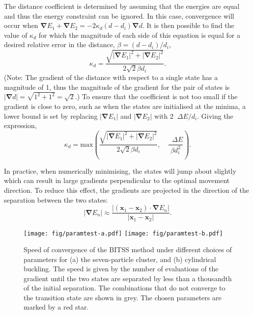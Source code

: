 \documentclass[aps,physrev,10pt]{revtex4-2}
\newcommand{\abs}[1]{\left| #1 \right|}
\newcommand{\grad}{\bm{\nabla}}
\newcommand{\upDelta}{\mathop{}\!\Delta}
\begin{document}
The distance coefficient is determined by assuming that the energies are equal and thus the energy constraint can be ignored.
In this case, convergence will occur when $\grad E_1 + \grad E_2 = -2 \kappa_d (d - d_i) \grad d$.
It is then possible to find the value of $\kappa_d$ for which the magnitude of each side of this equation is equal for a desired relative error in the distance, $\beta = (d - d_i) / d_i$,
\begin{equation}
  \kappa_d = \frac {\sqrt{\abs{\grad E_1}^2 + \abs{\grad E_2}^2}} {2 \sqrt{2} \beta d_i}.
\end{equation}
(Note: The gradient of the distance with respect to a single state has a magnitude of 1, thus the magnitude of the gradient for the pair of states is $\abs{\grad d} = \sqrt{1^2+1^2} = \sqrt{2}$.)
To ensure that the coefficient is not too small if the gradient is close to zero, such as when the states are initialised at the minima, a lower bound is set by replacing $\abs{\grad E_1}$ and $\abs{\grad E_2}$ with $2 \upDelta E / d_i$. Giving the expression,
\begin{equation}
  \kappa_d = \mathrm{max} \! \left(
  \frac {\sqrt{\abs{\grad E_1}^2 + \abs{\grad E_2}^2}} {2 \sqrt{2} \beta d_i}, \quad
  \frac{\upDelta E}{\beta d_i^2} \right).
\end{equation}

In practice, when numerically minimising, the states will jump about slightly which can result in large gradients perpendicular to the optimal movement direction.
To reduce this effect, the gradients are projected in the direction of the separation between the two states:
\begin{equation}
  \abs{\grad E_n} \approx \frac {\abs{(\bm{x}_1 - \bm{x}_2) \cdot \grad E_n}} {\abs{\bm{x}_1 - \bm{x}_2}}.
\end{equation}

\begin{figure}[htb]
  \texttt{[image: fig/paramtest-a.pdf]}%
  \texttt{[image: fig/paramtest-b.pdf]}%
  \caption{\label{fig:paramtest}
    Speed of convergence of the BITSS method under different choices of parameters for (a) the seven-particle cluster, and (b) cylindrical buckling.
    The speed is given by the number of evaluations of the gradient until the two states are separated by less than a thousandth of the initial separation.
    The combinations that do not converge to the transition state are shown in grey. 
    The chosen parameters are marked by a red star.
  }
\end{figure}
\end{document}
